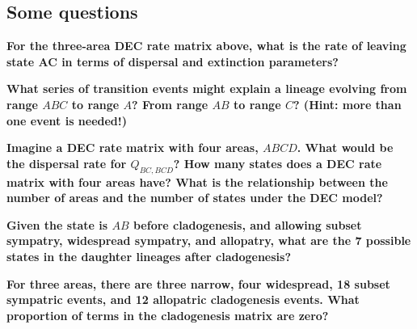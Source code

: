 \subsection{Some questions}

{\bf {} For the three-area DEC rate matrix above, what is the rate of leaving state AC in terms of dispersal and extinction parameters?}

{\bf {} What series of transition events might explain a lineage evolving from range $ABC$ to range $A$? From range $AB$ to range $C$? (Hint: more than one event is needed!)}

{ \bf {} Imagine a DEC rate matrix with four areas, $ABCD$. What would be the dispersal rate for $Q_{BC,BCD}$? How many states does a DEC rate matrix with four areas have? What is the relationship between the number of areas and the number of states under the DEC model? }

{\bf {} Given the state is $AB$ before cladogenesis, and allowing subset sympatry, widespread sympatry, and allopatry, what are the 7 possible states in the daughter lineages after cladogenesis?}

{\bf {} For three areas, there are three narrow, four widespread, 18 subset sympatric events, and 12 allopatric cladogenesis events. What proportion of terms in the cladogenesis matrix are zero?}




\newpage

